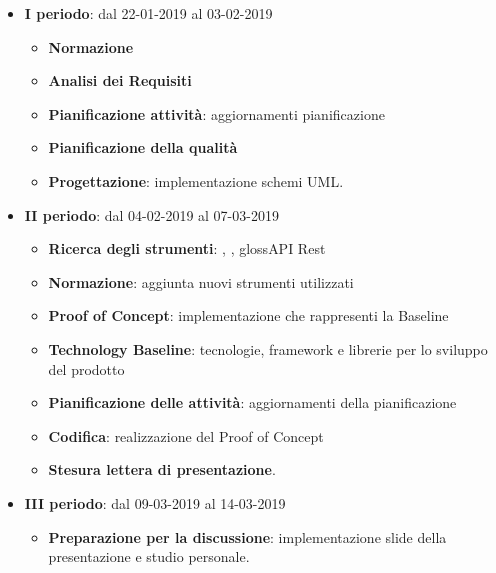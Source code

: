 		\begin{itemize}
			\item \textbf{I periodo}: dal 22-01-2019 al 03-02-2019
			\begin{itemize}
    	        \item \textbf{Normazione}
    	        \item \textbf{Analisi dei Requisiti}
    	        \item \textbf{Pianificazione attività}: aggiornamenti pianificazione
    	        \item \textbf{Pianificazione della qualità}
    	        \item \textbf{Progettazione}: implementazione schemi UML.
        	\end{itemize}
			\item \textbf{II periodo}: dal 04-02-2019 al 07-03-2019
			\begin{itemize}
				\item \textbf{Ricerca degli strumenti}: , , gloss{API Rest} 
    	        \item \textbf{Normazione}: aggiunta nuovi strumenti utilizzati
    	        \item \textbf{Proof of Concept}: implementazione che rappresenti la Baseline
    	        \item \textbf{Technology Baseline}: tecnologie, framework e librerie per lo sviluppo del prodotto
    	        \item \textbf{Pianificazione delle attività}: aggiornamenti della pianificazione
    	        \item \textbf{Codifica}: realizzazione del Proof of Concept
    	        \item \textbf{Stesura lettera di presentazione}.
        	\end{itemize}
        	\item \textbf{III periodo}: dal 09-03-2019 al 14-03-2019
			\begin{itemize}
				\item \textbf{Preparazione per la discussione}: implementazione slide della presentazione e studio personale.
        	\end{itemize}
		\end{itemize}
        

